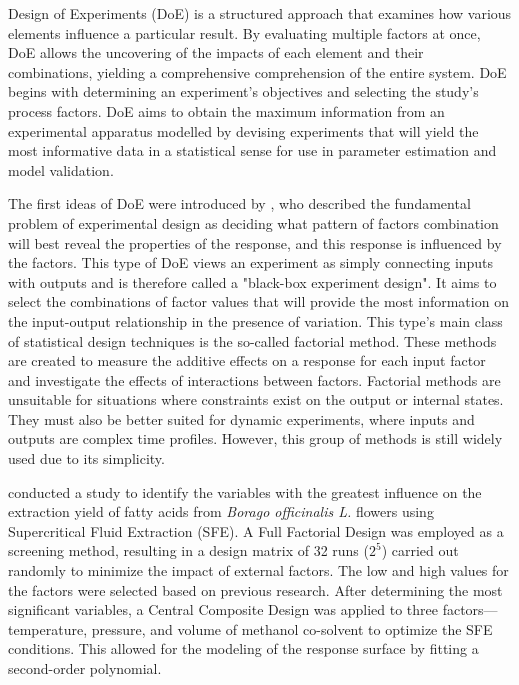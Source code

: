 \documentclass[../Article_Sensitivity_Analsysis.tex]{subfiles}
\begin{document}
	
	Design of Experiments (DoE) is a structured approach that examines how various elements influence a particular result. By evaluating multiple factors at once, DoE allows the uncovering of the impacts of each element and their combinations, yielding a comprehensive comprehension of the entire system. DoE begins with determining an experiment's objectives and selecting the study's process factors. DoE aims to obtain the maximum information from an experimental apparatus modelled by devising experiments that will yield the most informative data in a statistical sense for use in parameter estimation and model validation. 
	
	The first ideas of DoE were introduced by \citet{Fisher1935}, who described the fundamental problem of experimental design as deciding what pattern of factors combination will best reveal the properties of the response, and this response is influenced by the factors. This type of DoE views an experiment as simply connecting inputs with outputs and is therefore called a "black-box experiment design". It aims to select the combinations of factor values that will provide the most information on the input-output relationship in the presence of variation. This type's main class of statistical design techniques is the so-called factorial method. These methods are created to measure the additive effects on a response for each input factor and investigate the effects of interactions between factors. Factorial methods are unsuitable for situations where constraints exist on the output or internal states. They must also be better suited for dynamic experiments, where inputs and outputs are complex time profiles. However, this group of methods is still widely used due to its simplicity.
	
	\citet{Ramandi2011} conducted a study to identify the variables with the greatest influence on the extraction yield of fatty acids from \textit{Borago officinalis L.} flowers using Supercritical Fluid Extraction (SFE). A Full Factorial Design was employed as a screening method, resulting in a design matrix of 32 runs ($2^5$) carried out randomly to minimize the impact of external factors. The low and high values for the factors were selected based on previous research. After determining the most significant variables, a Central Composite Design was applied to three factors—temperature, pressure, and volume of methanol co-solvent to optimize the SFE conditions. This allowed for the modeling of the response surface by fitting a second-order polynomial.
	
\end{document}
